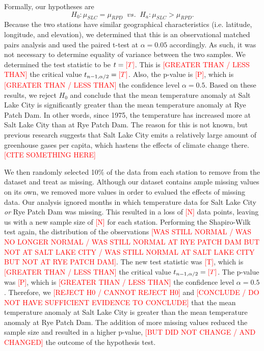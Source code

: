 \documentclass[final]{siamart1116}
\begin{document}
Formally, our hypotheses are $$ H_{0}: \mu_{SLC} = \mu_{RPD} \;\; vs. \;\; H_{a}: \mu_{SLC} > \mu_{RPD}.$$ Because the two stations have similar geographical characteristics (i.e. latitude, longitude, and elevation), we determined that this is an observational matched pairs analysis and used the paired t-test at $\alpha = 0.05$ accordingly. As such, it was not necessary to determine equality of variance between the two samples. We determined the test statistic to be $t = \textcolor{red}{[T]}$. This is \textcolor{red}{[GREATER THAN / LESS THAN]} the critical value $t_{n-1,\alpha/2} = \textcolor{red}{[T]}$. Also, the p-value is \textcolor{red}{[P]}, which is \textcolor{red}{[GREATER THAN / LESS THAN]} the confidence level $\alpha = 0.5$. Based on these results, we reject $H_{0}$ and conclude that the mean temperature anomaly at Salt Lake City is significantly greater than the mean temperature anomaly at Rye Patch Dam. In other words, since 1975, the temperature has increased more at Salt Lake City than at Rye Patch Dam. The reason for this is not known, but previous research suggests that Salt Lake City emits a relatively large amount of greenhouse gases per capita, which hastens the effects of climate change there. \textcolor{red}{[CITE SOMETHING HERE]}

We then randomly selected 10\% of the data from each station to remove from the dataset and treat as missing. Although our dataset contains ample missing values on its own, we removed more values in order to evalued the effects of missing data. Our analysis ignored months in which temperature data for Salt Lake City \textit{or} Rye Patch Dam was missing. This resulted in a loss of \textcolor{red}{[N]} data points, leaving us with a new sample size of \textcolor{red}{[N]} for each station. Performing the Shapiro-Wilk test again, the distribution of the observations \textcolor{red}{[WAS STILL NORMAL / WAS NO LONGER NORMAL / WAS STILL NORMAL AT RYE PATCH DAM BUT NOT AT SALT LAKE CITY / WAS STILL NORMAL AT SALT LAKE CITY BUT NOT AT RYE PATCH DAM]}. The new test statistic was \textcolor{red}{[T]}, which is \textcolor{red}{[GREATER THAN / LESS THAN]} the critical value  $t_{n-1,\alpha/2} = \textcolor{red}{[T]}$. The p-value was \textcolor{red}{[P]}, which is \textcolor{red}{[GREATER THAN / LESS THAN]} the confidence level $\alpha = 0.5$. Therefore, we \textcolor{red}{[REJECT H0 / CANNOT REJECT H0]} and \textcolor{red}{[CONCLUDE / DO NOT HAVE SUFFICIENT EVIDENCE TO CONCLUDE]} that the mean temperature anomaly at Salt Lake City is greater than the mean temperature anomaly at Rye Patch Dam. The addition of more missing values reduced the sample size and resulted in a higher p-value, \textcolor{red}{[BUT DID NOT CHANGE / AND CHANGED]} the outcome of the hypothesis test.
\end{document}
